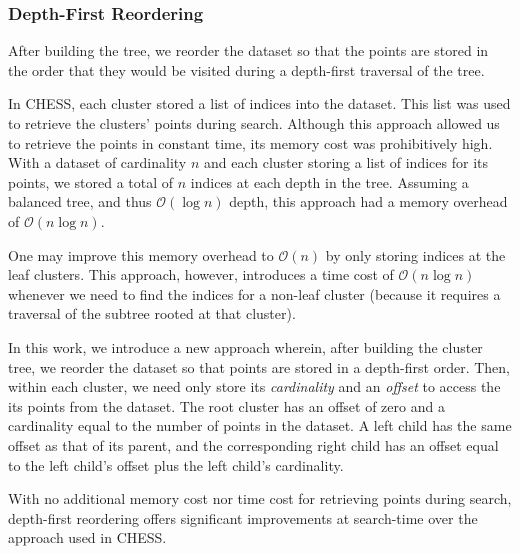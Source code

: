 \subsubsection{Depth-First Reordering}
\label{sec:methods:clustering:depth-first-reordering}

After building the tree, we reorder the dataset so that the points are stored in the order that they would be visited during a depth-first traversal of the tree.

In CHESS, each cluster stored a list of indices into the dataset.
This list was used to retrieve the clusters' points during search.
Although this approach allowed us to retrieve the points in constant time, its memory cost was prohibitively high.
With a dataset of cardinality $n$ and each cluster storing a list of indices for its points, we stored a total of $n$ indices at each depth in the tree.
Assuming a balanced tree, and thus $\mathcal{O}(\log n)$ depth, this approach had a memory overhead of $\mathcal{O}(n \log n)$.

One may improve this memory overhead to $\mathcal{O}(n)$ by only storing indices at the leaf clusters.
This approach, however, introduces a time cost of $\mathcal{O}(n \log n)$ whenever we need to find the indices for a non-leaf cluster (because it requires a traversal of the subtree rooted at that cluster).

In this work, we introduce a new approach wherein, after building the cluster tree, we reorder the dataset so that points are stored in a depth-first order.
Then, within each cluster, we need only store its \textit{cardinality} and an \textit{offset} to access the its points from the dataset.
The root cluster has an offset of zero and a cardinality equal to the number of points in the dataset.
A left child has the same offset as that of its parent, and the corresponding right child has an offset equal to the left child's offset plus the left child's cardinality.

With no additional memory cost nor time cost for retrieving points during search, depth-first reordering offers significant improvements at search-time over the approach used in CHESS.



